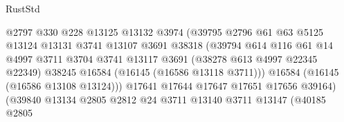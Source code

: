 \begin{lexlean}{RustStd}
\begin{coremodule}
                                          @2797
                                          @330
                                          @228
                                          @13125
                                          @13132
                                          @3974
                                          (@39795
                                            @2796
                                            @61
                                            @63
                                            @5125
                                            @13124
                                            @13131
                                            @3741
                                            @13107
                                            @3691
                                            @38318
                                            (@39794
                                              @614
                                              @116
                                              @61
                                              @14
                                              @4997
                                              @3711
                                              @3704
                                              @3741
                                              @13117
                                              @3691
                                              (@38278 @613 @4997 @22345 @22349)
                                              @38245
                                              @16584
                                              (@16145 (@16586 @13118 @3711)))
                                            @16584
                                            (@16145 (@16586 @13108 @13124)))
                                          @17641
                                          @17644
                                          @17647
                                          @17651
                                          @17656
                                          @39164)
                                        (@39840
                                          @13134
                                          @2805
                                          @2812
                                          @24
                                          @3711
                                          @13140
                                          @3711
                                          @13147
                                          (@40185
                                            @2805

\end{coremodule}
\end{lexlean}
